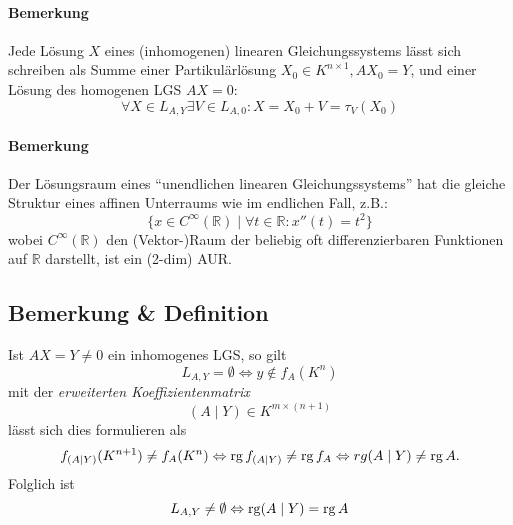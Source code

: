 \paragraph{Bemerkung}
	Jede Lösung $ X $ eines (inhomogenen) linearen Gleichungssystems lässt sich schreiben als Summe einer Partikulärlösung $ X_0 \in K^{n\times 1},AX_0 = Y $, und einer Lösung des homogenen LGS $ AX = 0 $:
		\[ \forall X\in L_{A,Y}\exists V\in L_{A,0}:X=X_0+V=\tau_V(X_0) \]
\paragraph{Bemerkung}
	Der Lösungsraum eines "`unendlichen linearen Gleichungssystems"' hat die gleiche Struktur eines affinen Unterraums wie im endlichen Fall, z.B.:
		\[ \{x\in C^\infty(\mathbb{R})\mid \forall t\in \mathbb{R}:x''(t) = t^2 \} \]
	wobei $ C^\infty(\mathbb{R}) $ den (Vektor-)Raum der beliebig oft differenzierbaren Funktionen auf $ \mathbb{R} $ darstellt, ist ein (2-dim) AUR.
\subsection{Bemerkung \& Definition}
	\begin{Definition}
	Ist $ AX=Y \neq 0$ ein inhomogenes LGS, so gilt
		\[ L_{A,Y} = \emptyset \Leftrightarrow y\notin f_A(K^n) \]
	mit der \emph{erweiterten Koeffizientenmatrix}
		\[ (A\mid Y) \in K^{m\times (n+1)} \]
	lässt sich dies formulieren als
		\[ f_{(A\mid Y)}(K^{n+1})\neq f_A(K^n) \Leftrightarrow \operatorname{rg} f_{(A\mid Y)}\neq \operatorname{rg} f_A \Leftrightarrow rg (A\mid Y) \neq \operatorname{rg} A. \]
	Folglich ist
		\[ L_{A,Y} \neq \emptyset \Leftrightarrow \operatorname{rg} (A\mid Y) = \operatorname{rg} A \]
	\end{Definition}
